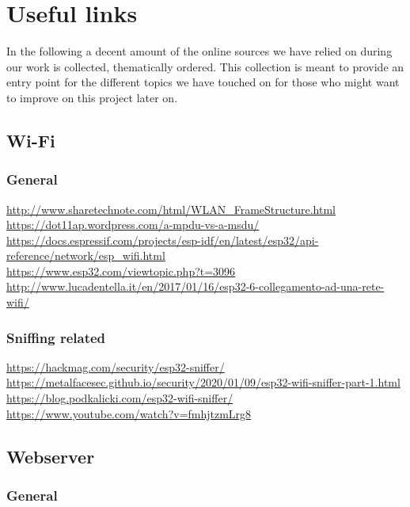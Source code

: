 \documentclass[11pt,a4paper]{article}
\begin{document}
\section{Useful links}

In the following a decent amount of the online sources we have relied on during our work is collected, thematically ordered. This collection is meant to provide an entry point for the different topics we have touched on for those who might want to improve on this project later on.

\subsection{Wi-Fi}

\subsubsection{General}

\url{http://www.sharetechnote.com/html/WLAN_FrameStructure.html}\\[4pt]
\url{https://dot11ap.wordpress.com/a-mpdu-vs-a-msdu/}\\[4pt]
\url{https://docs.espressif.com/projects/esp-idf/en/latest/esp32/api-reference/network/esp_wifi.html}\\[4pt]
\url{https://www.esp32.com/viewtopic.php?t=3096}\\[4pt]
\url{http://www.lucadentella.it/en/2017/01/16/esp32-6-collegamento-ad-una-rete-wifi/}

\subsubsection{Sniffing related}

\url{https://hackmag.com/security/esp32-sniffer/}\\[4pt]
\url{https://metalfacesec.github.io/security/2020/01/09/esp32-wifi-sniffer-part-1.html}\\[4pt]
\url{https://blog.podkalicki.com/esp32-wifi-sniffer/}\\[4pt]
\url{https://www.youtube.com/watch?v=fmhjtzmLrg8}


\subsection{Webserver}


\subsubsection{General}
\end{document}
